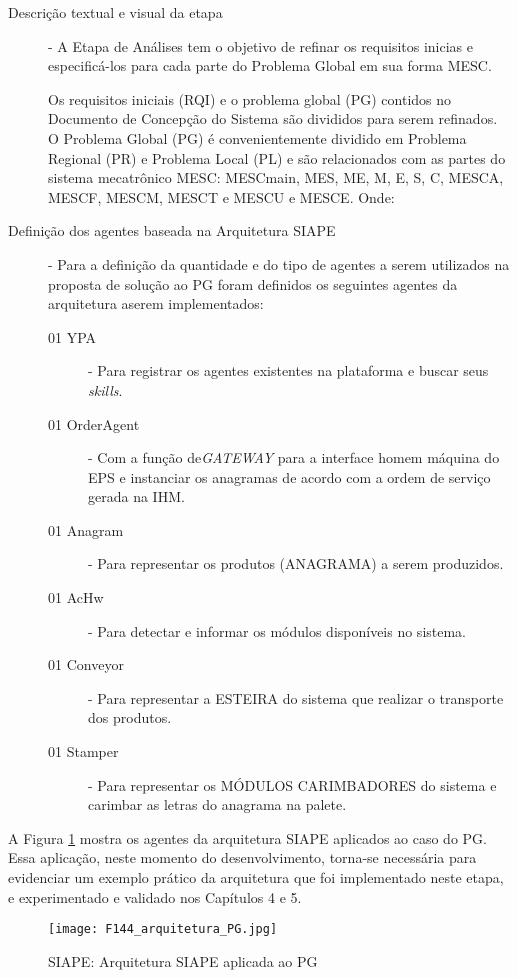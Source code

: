\begin{description}
\item[Descrição textual e visual da etapa] - A Etapa de Análises tem o objetivo de refinar os requisitos inicias e especificá-los para cada parte do Problema Global em sua forma MESC. \par 
Os requisitos iniciais (RQI) e o problema global (PG) contidos no Documento de Concepção do Sistema são divididos para serem refinados. 	O Problema Global (PG) é convenientemente dividido em Problema Regional (PR) e Problema Local (PL) e são relacionados com as partes do sistema mecatrônico MESC: MESCmain, MES, ME, M, E, S, C, MESCA, MESCF, MESCM, MESCT e MESCU e MESCE. Onde:

\item[Definição dos agentes baseada na Arquitetura SIAPE] - Para a definição da quantidade e do tipo de agentes a serem utilizados na proposta de solução ao PG foram definidos os seguintes agentes da arquitetura aserem implementados:

\begin{description}
	\item[01 YPA ]- Para registrar os agentes existentes na plataforma e buscar seus \textit{skills}.	
	\item[01 OrderAgent] - Com a função de\textit{GATEWAY} para a interface homem máquina do EPS e instanciar os anagramas de acordo com a ordem de serviço gerada na IHM.	
	\item[01 Anagram] - Para representar os produtos (ANAGRAMA) a serem produzidos.
	\item[01 AcHw] - Para detectar e informar os módulos disponíveis no sistema.
	\item[01 Conveyor] - Para representar a ESTEIRA do sistema que realizar o transporte dos produtos.	
	\item[01 Stamper] - Para representar os MÓDULOS CARIMBADORES do sistema e carimbar as letras do anagrama na palete.
\end{description}
\end{description}

	A Figura \ref{F145} mostra os agentes da arquitetura SIAPE aplicados ao caso do PG. Essa aplicação, neste momento do desenvolvimento, torna-se necessária para evidenciar um exemplo prático da arquitetura que foi implementado neste etapa, e experimentado e validado nos Capítulos 4 e 5.
	
	\begin{figure}[h]
		\centering
		\texttt{[image: F144\_arquitetura\_PG.jpg]} 
		\caption{SIAPE: Arquitetura SIAPE aplicada ao PG}
		\label{F145}
	\end{figure}

